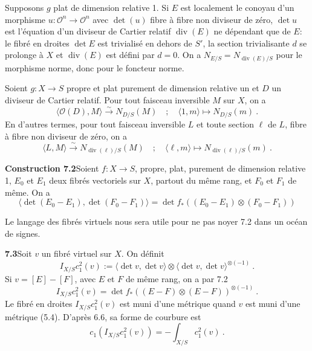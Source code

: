 \documentclass[12pt,a4paper]{article}
\theoremstyle{plain}
\theoremstyle{definition}
\theoremstyle{remark}
\DeclareMathOperator{\divm}{div}
\newcommand{\calO}{\mathcal{O}}
\newcommand{\simto}{\xrightarrow{\sim}}
\begin{document}
Supposons $g$ plat de dimension relative 1. Si $E$ est localement le conoyau d'un morphisme $u: \calO^n \to \calO^n$ avec $\det(u)$ fibre \`a fibre non diviseur de z\'ero, $\det u$ est l'\'equation d'un diviseur de Cartier relatif $\divm(E)$ ne d\'ependant que de $E$: le fibr\'e en droites $\det E$ est trivialis\'e en dehors de $S'$, la section trivialisante $d$ se prolonge \`a $X$ et $\divm(E)$ est d\'efini par $d = 0$. On a $N_{E/S} = N_{\divm(E)/S}$ pour le morphisme norme, donc pour le foncteur norme.

Soient $g: X \to S$ propre et plat purement de dimension relative un et $D$ un diviseur de Cartier relatif. Pour tout faisceau inversible $M$ sur $X$, on a
\[
\langle \calO(D), M \rangle \simto N_{D/S}(M) \quad ; \quad \langle 1, m \rangle \longmapsto N_{D/S}(m) \ .
\]
En d'autres termes, pour tout faisceau inversible $L$ et toute section $\ell$ de $L$, fibre \`a fibre non diviseur de z\'ero, on a
\[
\langle L, M \rangle \simto N_{\divm(\ell)/S}(M) \quad ; \quad \langle \ell, m \rangle \longmapsto N_{\divm(\ell)/S}(m) \ .
\]

\medskip
\noindent\textbf{Construction 7.2}\quad Soient $f: X \to S$, propre, plat, purement de dimension relative 1, $E_0$ et $E_1$ deux fibr\'es vectoriels sur $X$, partout du m\^eme rang, et $F_0$ et $F_1$ de m\^eme. On a
\begin{equation}
\label{eq:7.2.1}
\langle \det(E_0 - E_1), \det(F_0 - F_1) \rangle = \det f_*((E_0 - E_1) \otimes (F_0 - F_1))
\end{equation}

Le langage des fibr\'es virtuels nous sera utile pour ne pas noyer 7.2 dans un oc\'ean de signes.

\medskip
\noindent\textbf{7.3}\quad Soit $v$ un fibr\'e virtuel sur $X$. On d\'efinit
\begin{equation}
\label{eq:7.3.1}
I_{X/S} c_1^2(v) := \langle \det v, \det v \rangle \otimes \langle \det v, \det v \rangle^{\otimes(-1)} \ .
\end{equation}
Si $v = [E] - [F]$, avec $E$ et $F$ de m\^eme rang, on a par 7.2
\begin{equation}
\label{eq:7.3.2}
I_{X/S} c_1^2(v) = \det f_*((E - F) \otimes (E - F))^{\otimes(-1)} \ .
\end{equation}
Le fibr\'e en droites $I_{X/S} c_1^2(v)$ est muni d'une m\'etrique quand $v$ est muni d'une m\'etrique (5.4). D'apr\`es 6.6, sa forme de courbure est
\begin{equation}
\label{eq:7.3.3}
c_1(I_{X/S} c_1^2(v)) = -\int_{X/S} c_1^2(v) \ .
\end{equation}
\end{document}
